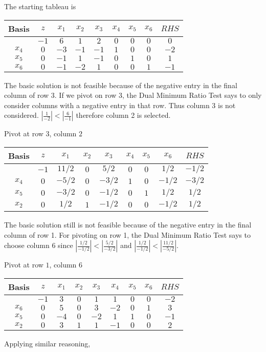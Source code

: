 \documentclass{article}[12pt,a4paper]
\begin{document}
\begin{enumerate}
  The starting tableau is
  \begin{center}
  \begin{tabular}{c | c | c c c c c c | c}
  Basis & $z$ & $x_1$ & $x_2$ & $x_3$ & $x_4$ & $x_5$ & $x_6$ & $RHS$ \\ \hline
           & $-1$ & $6$ & $1$ & $2$ & $0$ & $0$ & $0$ & $0$ \\ \hline
  $x_4$ & $0$ & $-3$ & $-1$ & $-1$ & $1$ & $0$ & $0$ & $-2$ \\
  $x_5$ & $0$ & $-1$ & $1$ & $-1$ & $0$ & $1$ & $0$ & $1$ \\
  $x_6$ & $0$ & $-1$ & $-2$ & $1$ & $0$ & $0$ & $1$ & $-1$
  \end{tabular}
  \end{center}
  The basic solution is not feasible because of the negative entry in the final column of row 3.
  If we pivot on row 3, the Dual Minimum Ratio Test says to only consider columns with a negative
  entry in that row. Thus column 3 is not considered. $|\frac{1}{-2}| < |\frac{6}{-1}|$ therefore
  column 2 is selected. 
  
   Pivot at row $3$, column $2$
   \begin{center}
  \begin{tabular}{c | c | c c c c c c | c}
  Basis & $z$ & $x_1$ & $x_2$ & $x_3$ & $x_4$ & $x_5$ & $x_6$ & $RHS$ \\ \hline
           & $-1$ & $11/2$ & $0$ & $5/2$ & $0$ & $0$ & $1/2$ & $-1/2$ \\ \hline
  $x_4$ & $0$ & $-5/2$ & $0$ & $-3/2$ & $1$ & $0$ & $-1/2$ & $-3/2$ \\
  $x_5$ & $0$ & $-3/2$ & $0$ & $-1/2$ & $0$ & $1$ & $1/2$ & $1/2$ \\
  $x_2$ & $0$ & $1/2$ & $1$ & $-1/2$ & $0$ & $0$ & $-1/2$ & $1/2$
  \end{tabular}
  \end{center}  
  
  The basic solution still is not feasible because of the negative entry in the final column of row 1.
  For pivoting on row 1, the Dual Minimum Ratio Test says to choose column 6 since 
  $|\frac{1/2}{-1/2}| < |\frac{5/2}{-3/2}|$ and $|\frac{1/2}{-1/2}| < |\frac{11/2}{-5/2}|$.
  \pagebreak
  
  Pivot at row $1$, column $6$
   \begin{center}
  \begin{tabular}{c | c | c c c c c c | c}
  Basis & $z$ & $x_1$ & $x_2$ & $x_3$ & $x_4$ & $x_5$ & $x_6$ & $RHS$ \\ \hline
           & $-1$ & $3$ & $0$ & $1$ & $1$ & $0$ & $0$ & $-2$ \\ \hline
  $x_6$ & $0$ & $5$ & $0$ & $3$ & $-2$ & $0$ & $1$ & $3$ \\
  $x_5$ & $0$ & $-4$ & $0$ & $-2$ & $1$ & $1$ & $0$ & $-1$ \\
  $x_2$ & $0$ & $3$ & $1$ & $1$ & $-1$ & $0$ & $0$ & $2$
  \end{tabular}
  \end{center}  
  Applying similar reasoning,
  

\end{enumerate}
\end{document}
